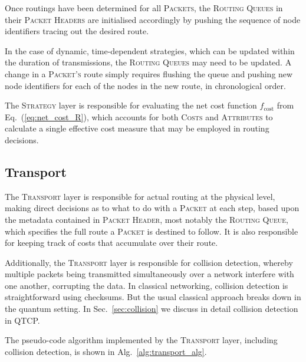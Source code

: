 \documentclass[aps,rmp,twocolumn,amsmath,amssymb,nofootinbib,superscriptaddress,longbibliography,floatfix,table-of-contents,eqsecnum]{revtex4-1}
\begin{document}
Once routings have been determined for all \textsc{Packets}, the \textsc{Routing Queues} in their \textsc{Packet Headers} are initialised accordingly by pushing the sequence of node identifiers tracing out the desired route.

In the case of dynamic, time-dependent strategies, which can be updated within the duration of transmissions, the \textsc{Routing Queues} may need to be updated. A change in a \textsc{Packet's} route simply requires flushing the queue and pushing new node identifiers for each of the nodes in the new route, in chronological order.

The \textsc{Strategy} layer is responsible for evaluating the net cost function $f_\text{cost}$ from Eq.~(\ref{eq:net_cost_R}), which accounts for both \textsc{Costs} and \textsc{Attributes} to calculate a single effective cost measure that may be employed in routing decisions.

%
%

\subsection{Transport} \label{sec:transport} 

The \textsc{Transport} layer is responsible for actual routing at the physical level, making direct decisions as to what to do with a \textsc{Packet} at each step, based upon the metadata contained in \textsc{Packet Header}, most notably the \textsc{Routing Queue}, which specifies the full route a \textsc{Packet} is destined to follow. It is also responsible for keeping track of costs that accumulate over their route.

Additionally, the \textsc{Transport} layer is responsible for collision detection, whereby multiple packets being transmitted simultaneously over a network interfere with one another, corrupting the data. In classical networking, collision detection is straightforward using checksums. But the usual classical approach breaks down in the quantum setting. In Sec.~\ref{sec:collision} we discuss in detail collision detection in QTCP.

The pseudo-code algorithm implemented by the \textsc{Transport} layer, including collision detection, is shown in Alg.~\ref{alg:transport_alg}.
\end{document}
